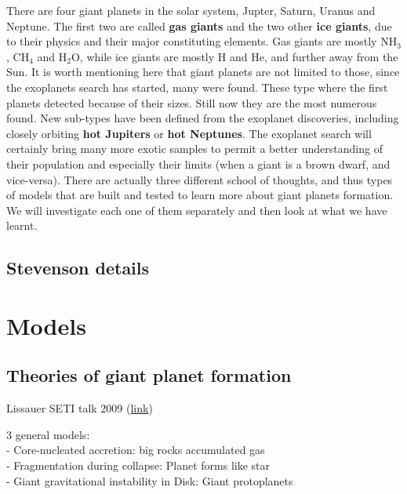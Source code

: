 \documentclass[12pt]{article} %
\begin{document}
There are four giant planets in the solar system, Jupter, Saturn, Uranus and Neptune. The first two are called \textbf{gas giants} and the two other \textbf{ice giants}, due to their physics and their major constituting elements. Gas giants are mostly NH$_3$, CH$_4$ and H$_2$O, while ice giants are mostly H and He, and further away from the Sun.\newline\linebreak
It is worth mentioning here that giant planets are not limited to those, since the exoplanets search has started, many were found. These type where the first planets detected because of their sizes. Still now they are the most numerous found. New sub-types have been defined from the exoplanet discoveries, including closely orbiting \textbf{hot Jupiters} or \textbf{hot Neptunes}. The exoplanet search will certainly bring many more exotic samples to permit a better understanding of their population and especially their limits (when a giant is a brown dwarf, and vice-versa).\newline\linebreak
There are actually three different school of thoughts, and thus types of models that are built and tested to learn more about giant planets formation. We will investigate each one of them separately and then look at what we have learnt.
\clearpage



\subsection{Stevenson details}\vspace{-1ex}\bigskip

\cite{stevenson1982formation}


\section{Models}\vspace{-2ex}\titlerule[1pt]\bigskip

\subsection{Theories of giant planet formation}\vspace{-1ex}\bigskip

Lissauer SETI talk 2009 (\href{https://www.youtube.com/watch?v=FAa7hb2bT\_g}{link})\newline 

3 general models: \\
- Core-nucleated accretion: big rocks accumulated gas\\
- Fragmentation during collapse: Planet forms like star\\
- Giant gravitational instability in Disk: Giant protoplanets\\
\end{document}
